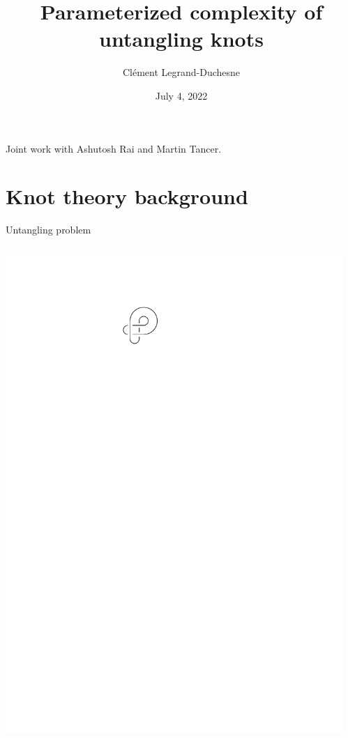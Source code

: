 \documentclass[11pt,xcolor=dvipsnames,presentation]{beamer}
\begin{document}
\title{Parameterized complexity of untangling knots}
\author[Clément Legrand]{Clément Legrand-Duchesne}
\date{July 4, 2022}

\begin{frame}
  \titlepage
  \begin{center}
  Joint work with Ashutosh Rai and Martin Tancer.
  \end{center}

\end{frame}

\section*{Knot theory background}

\begin{frame}{Untangling problem}
  \begin{columns}
    \begin{column}{.25\textwidth}
      \centering
      \includegraphics[width=.5\textwidth]{diagram_example.pdf}
    \end{column}
    \begin{column}{.75\textwidth}
      \centering
\end{column}
\end{columns}
\end{frame}
\end{document}
